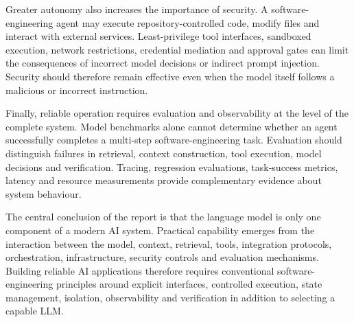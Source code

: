 Greater autonomy also increases the importance of security. A software-engineering agent may execute repository-controlled code, modify files and interact with external services. Least-privilege tool interfaces, sandboxed execution, network restrictions, credential mediation and approval gates can limit the consequences of incorrect model decisions or indirect prompt injection. Security should therefore remain effective even when the model itself follows a malicious or incorrect instruction.

Finally, reliable operation requires evaluation and observability at the level of the complete system. Model benchmarks alone cannot determine whether an agent successfully completes a multi-step software-engineering task. Evaluation should distinguish failures in retrieval, context construction, tool execution, model decisions and verification. Tracing, regression evaluations, task-success metrics, latency and resource measurements provide complementary evidence about system behaviour.

The central conclusion of the report is that the language model is only one component of a modern AI system. Practical capability emerges from the interaction between the model, context, retrieval, tools, integration protocols, orchestration, infrastructure, security controls and evaluation mechanisms. Building reliable AI applications therefore requires conventional software-engineering principles around explicit interfaces, controlled execution, state management, isolation, observability and verification in addition to selecting a capable LLM.
